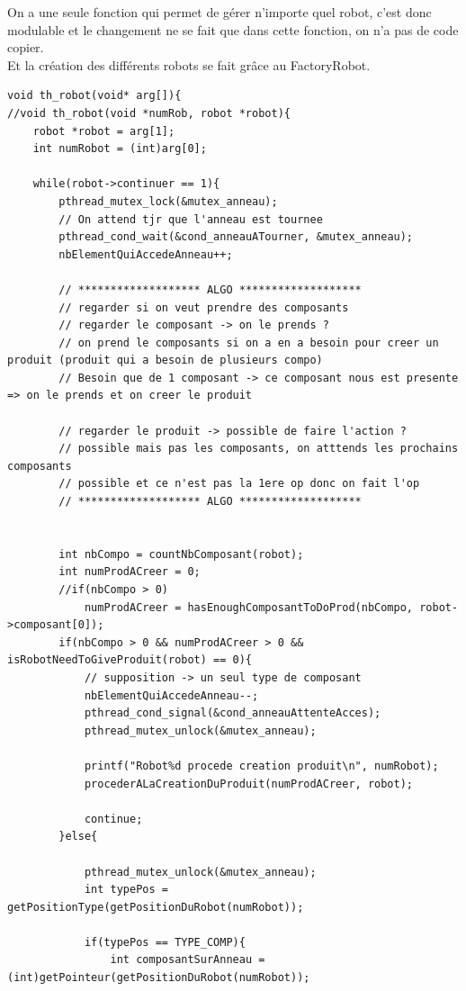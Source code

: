 \documentclass{report}
\begin{document}
On a une seule fonction qui permet de gérer n'importe quel robot, c'est donc modulable et le changement ne se fait que dans cette fonction, on n'a pas de code copier.\\
Et la création des différents robots se fait grâce au FactoryRobot.
\begin{lstlisting}[caption=Fonction thread des robots]
void th_robot(void* arg[]){
//void th_robot(void *numRob, robot *robot){
    robot *robot = arg[1];
    int numRobot = (int)arg[0];
    
    while(robot->continuer == 1){
        pthread_mutex_lock(&mutex_anneau);
        // On attend tjr que l'anneau est tournee
        pthread_cond_wait(&cond_anneauATourner, &mutex_anneau);
        nbElementQuiAccedeAnneau++;
        
        // ******************* ALGO *******************
        // regarder si on veut prendre des composants
        // regarder le composant -> on le prends ?
        // on prend le composants si on a en a besoin pour creer un produit (produit qui a besoin de plusieurs compo)
        // Besoin que de 1 composant -> ce composant nous est presente => on le prends et on creer le produit
        
        // regarder le produit -> possible de faire l'action ?
        // possible mais pas les composants, on atttends les prochains composants
        // possible et ce n'est pas la 1ere op donc on fait l'op
        // ******************* ALGO *******************
        
        
        int nbCompo = countNbComposant(robot);
        int numProdACreer = 0;
        //if(nbCompo > 0)
            numProdACreer = hasEnoughComposantToDoProd(nbCompo, robot->composant[0]);
        if(nbCompo > 0 && numProdACreer > 0 && isRobotNeedToGiveProduit(robot) == 0){
            // supposition -> un seul type de composant
            nbElementQuiAccedeAnneau--;
            pthread_cond_signal(&cond_anneauAttenteAcces);
            pthread_mutex_unlock(&mutex_anneau);
            
            printf("Robot%d procede creation produit\n", numRobot);
            procederALaCreationDuProduit(numProdACreer, robot);
            
            continue;
        }else{
        
            pthread_mutex_unlock(&mutex_anneau);
            int typePos = getPositionType(getPositionDuRobot(numRobot));
            
            if(typePos == TYPE_COMP){
                int composantSurAnneau = (int)getPointeur(getPositionDuRobot(numRobot));
                

\end{lstlisting}
\end{document}
